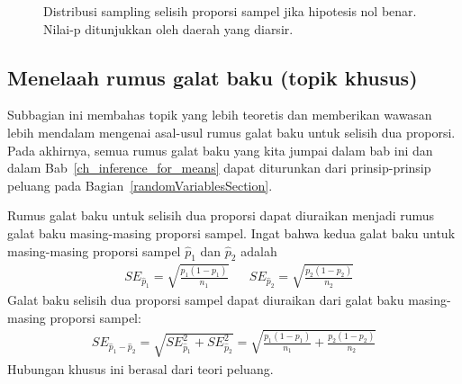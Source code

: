 \begin{figure}[h]
  \centering
  \caption{Distribusi sampling selisih proporsi sampel jika hipotesis
      nol benar.
      Nilai-p ditunjukkan oleh daerah yang diarsir.}
  \label{bladesTwoSampleHTPValueQC}
\end{figure}



\subsection{Menelaah rumus galat baku
    (topik khusus)}

Subbagian ini membahas topik yang lebih teoretis
dan memberikan wawasan lebih mendalam mengenai asal-usul
rumus galat baku untuk selisih dua
proporsi.
Pada akhirnya, semua rumus galat baku
yang kita jumpai dalam bab ini dan dalam
Bab~\ref{ch_inference_for_means}
dapat diturunkan dari prinsip-prinsip peluang pada
Bagian~\ref{randomVariablesSection}.

Rumus galat baku untuk selisih
dua proporsi dapat diuraikan menjadi rumus
galat baku masing-masing proporsi sampel.
Ingat bahwa kedua galat baku untuk masing-masing
proporsi sampel $\hat{p}_1$ dan $\hat{p}_2$ adalah
\begin{align*}
&SE_{\hat{p}_1} = \sqrt{\frac{{p}_1 (1 - {p}_1)}{n_1}}
&&SE_{\hat{p}_2} = \sqrt{\frac{{p}_2 (1 - {p}_2)}{n_2}}
\end{align*}
Galat baku selisih dua proporsi sampel
dapat diuraikan dari galat baku masing-masing
proporsi sampel:
\begin{align*}
SE_{\hat{p}_{1} - \hat{p}_{2}}
	= \sqrt{SE_{\hat{p}_1}^2 + SE_{\hat{p}_2}^2}
	= \sqrt{\frac{{p}_1 (1 - {p}_1)}{n_1}
	    + \frac{{p}_2 (1 - {p}_2)}{n_2}}
\end{align*}
Hubungan khusus ini berasal dari teori peluang.

